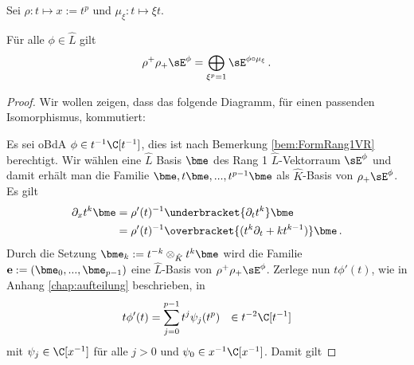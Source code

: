 Sei $\rho:t\mapsto x:=t^p$ und $\mu_\xi:t\mapsto\xi t$.
\begin{lem}
\cite[Lem 2.4]{sabbah_Fourier-local}
Für alle $\phi \in \hat L$ gilt
\[
\rho^+\rho_+\sE^\phi=\bigoplus_{\xi^p=1}\sE^{\phi\circ\mu_\xi} \,.
\]
\end{lem}
%
\begin{proof}
Wir wollen zeigen, dass das folgende Diagramm, für einen passenden
Isomorphismus, kommutiert:
\begin{center}
\end{center}
Es sei oBdA $\phi\in t^{-1}\C[t^{-1}]$, dies ist nach Bemerkung 
\ref{bem:FormRang1VR} berechtigt.
Wir wählen eine $\hat L$ Basis $\bme$ des Rang 1 $\hat L$-Vektorraum $\sE^\phi$
und damit erhält man die Familie $\bme,t\bme,...,t^{p-1}\bme$ als $\hat
K$-Basis von $\rho_+\sE^\phi$.
Es gilt 
\begin{equation} \label{eq:2-4-basisAbleitung}
\begin{aligned}
\partial_xt^{k}\bme &= \rho'(t)^{-1}\underbracket{\partial_tt^{k}}\bme
\\&= \rho'(t)^{-1}\overbracket{(t^{k}\partial_t + kt^{k-1})}\bme \,.
\end{aligned}
\end{equation}
Durch die Setzung $\bme_k:=t^{-k}\otimes_{\hat K}t^k\bme$ wird die Familie
$\mathbf{e}:=(\bme_0,...,\bme_{p-1})$ eine $\hat L$-Basis von
$\rho^+\rho_+\sE^\phi$.
Zerlege nun $t\phi'(t)$, wie in Anhang \ref{chap:aufteilung} beschrieben, in
\begin{align} \label{eq:2-4-gleichung1}
t\phi'(t)&=\sum_{j=0}^{p-1}t^j\psi_j(t^p) &\in t^{-2}\C[t^{-1}]
\end{align}
mit $\psi_j\in\C[x^{-1}]$ für alle $j>0$ und $\psi_0\in x^{-1}\C[x^{-1}]$.
Damit gilt

\end{proof}
